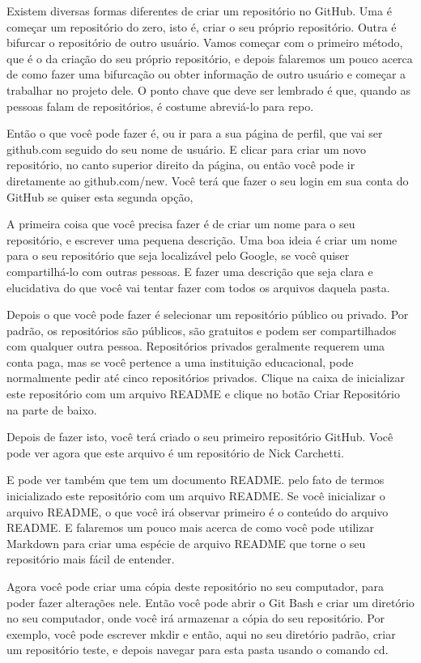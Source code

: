 Existem diversas formas diferentes de criar um repositório no GitHub. Uma é começar um repositório do zero, isto é, criar o seu próprio repositório. Outra é bifurcar o repositório de outro usuário. Vamos começar com o primeiro método, que é o da criação do seu próprio repositório, e depois falaremos um pouco acerca de como fazer uma bifurcação ou obter informação de outro usuário e começar a trabalhar no projeto dele. O ponto chave que deve ser lembrado é que, quando as pessoas falam de repositórios, é costume abreviá-lo para repo. 

Então o que você pode fazer é, ou ir para a sua página de perfil, que vai ser github.com seguido do seu nome de usuário. E clicar para criar um novo repositório, no canto superior direito da página, ou então você pode ir diretamente ao github.com/new. Você terá que fazer o seu login em sua conta do GitHub se quiser esta segunda opção, 

A primeira coisa que você precisa fazer é de criar um nome para o seu repositório, e escrever uma pequena descrição. Uma boa ideia é criar um nome para o seu repositório que seja localizável pelo Google, se você quiser compartilhá-lo com outras pessoas. E fazer uma descrição que seja clara e elucidativa  do que você vai tentar fazer com todos os arquivos daquela pasta. 

Depois o que você pode fazer é selecionar um repositório público ou privado. Por padrão, os repositórios são públicos, são gratuitos e podem ser compartilhados com qualquer outra pessoa. Repositórios privados geralmente requerem uma conta paga, mas se você pertence a uma instituição educacional, pode normalmente pedir até cinco repositórios privados. Clique na caixa de inicializar este repositório com um arquivo README e clique no botão Criar Repositório na parte de baixo.  

Depois de fazer isto, você terá criado o seu primeiro repositório GitHub. Você pode ver agora que este arquivo é um repositório de Nick Carchetti. 

E pode ver também que tem um documento README. pelo fato de termos inicializado este repositório com um arquivo README. Se você inicializar o arquivo README, o que você irá observar primeiro é o conteúdo do arquivo README. E falaremos um pouco mais acerca de como você pode utilizar Markdown para criar uma espécie de arquivo README que torne o seu repositório mais fácil de entender. 

Agora você pode criar uma cópia deste repositório no seu computador, para poder fazer alterações nele.  Então você pode abrir o Git Bash e criar um diretório no seu computador, onde você irá armazenar a cópia do seu repositório. Por exemplo, você pode escrever mkdir e então, aqui no seu diretório padrão, criar um repositório teste, e depois navegar para esta pasta usando o comando cd. 

